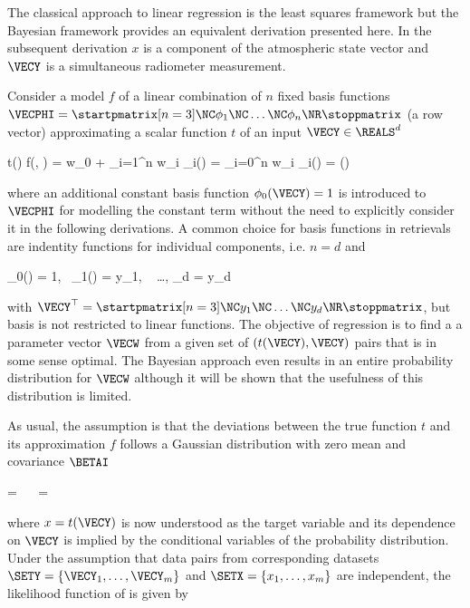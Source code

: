     The classical approach to linear regression is the least squares framework
    but the Bayesian framework provides an equivalent derivation presented
    here. In the subsequent derivation $x$ is a component of the atmospheric
    state vector and $\VECY$ is a  simultaneous radiometer measurement.

    Consider a model $f$ of a linear combination of $n$ fixed basis functions
    $\VECPHI = \startpmatrix[n=3] \NC \phi_1 \NC \dots \NC \phi_n \NR
    \stoppmatrix$ (a row vector) approximating a scalar
    function $t$ of an input $\VECY \in \REALS^d$

    \startformula
        t(\VECY) \approx f(\VECY, \VECW) = w_0 + \sum_{i=1}^n w_i \phi_i(\VECY)
            = \sum_{i=0}^n w_i \phi_i(\VECY) = \VECPHI(\VECY) \VECW
    \stopformula

    where an additional constant basis function $\phi_0(\VECY) = 1$ is
    introduced to $\VECPHI$ for modelling the constant term without the need to
    explicitly consider it in the following derivations. A common choice for
    basis functions in retrievals are indentity functions for individual
    components, i.e. $n = d$ and

    \startformula
        \phi_0(\VECY) = 1,~ \phi_1(\VECY) = y_1, ~ \dots, \phi_d = y_d
    \stopformula

    with $\VECY^\top = \startpmatrix[n=3] \NC y_1 \NC \dots \NC y_d \NR \stoppmatrix$,
    but basis is not restricted to linear functions. The objective of
    regression is to find a a parameter vector $\VECW$ from a given set of
    $(t(\VECY), \VECY)$ pairs that is in some sense optimal. The Bayesian
    approach even results in an entire probability distribution for $\VECW$
    although it will be shown that the usefulness of this distribution is
    limited.

    As usual, the assumption is that the deviations between the true function
    $t$ and its approximation $f$ follows a Gaussian distribution with zero
    mean and covariance $\BETAI$

    \placeformula
    \startformula
    \startalign[n=3,align={left,right,left}]
        \NC \NC {} = \NC
                 \NR
        \NC \Rightarrow~~ \NC {} = \NC
             \EQCOMMA {}
    \stopalign
    \stopformula

    where $x = t(\VECY)$ is now understood as the target variable and its
    dependence on $\VECY$ is implied by the conditional variables of the
    probability distribution. Under the assumption that data pairs from
    corresponding datasets $\SETY = \{ \VECY_1, \dots, \VECY_m \}$ and $\SETX
    = \{ x_1, \dots, x_m \}$ are independent, the likelihood function of
    is given by

